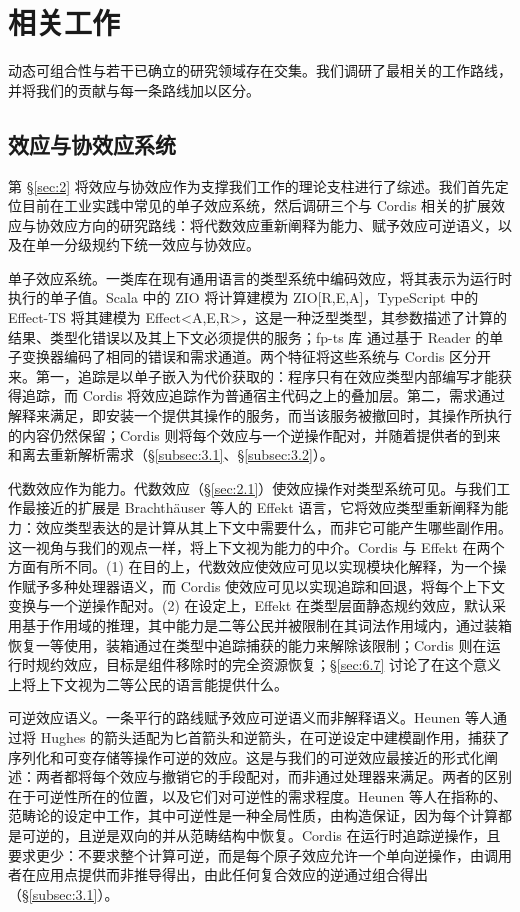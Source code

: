 \section{相关工作}
\label{sec:7}

动态可组合性与若干已确立的研究领域存在交集。我们调研了最相关的工作路线，并将我们的贡献与每一条路线加以区分。

\subsection{效应与协效应系统}
\label{sec:7.1}

第 \S\ref{sec:2} 将效应与协效应作为支撑我们工作的理论支柱进行了综述。我们首先定位目前在工业实践中常见的单子效应系统，然后调研三个与 Cordis 相关的扩展效应与协效应方向的研究路线：将代数效应重新阐释为能力、赋予效应可逆语义，以及在单一分级规约下统一效应与协效应。

单子效应系统。一类库在现有通用语言的类型系统中编码效应，将其表示为运行时执行的单子值。Scala 中的 ZIO\cite{ref82} 将计算建模为 ZIO[R,E,A]，TypeScript 中的 Effect-TS\cite{ref83} 将其建模为 Effect<A,E,R>，这是一种泛型类型，其参数描述了计算的结果、类型化错误以及其上下文必须提供的服务；fp-ts 库\cite{ref84} 通过基于 Reader 的单子变换器编码了相同的错误和需求通道。两个特征将这些系统与 Cordis 区分开来。第一，追踪是以单子嵌入为代价获取的：程序只有在效应类型内部编写才能获得追踪，而 Cordis 将效应追踪作为普通宿主代码之上的叠加层。第二，需求通过解释来满足，即安装一个提供其操作的服务，而当该服务被撤回时，其操作所执行的内容仍然保留；Cordis 则将每个效应与一个逆操作配对，并随着提供者的到来和离去重新解析需求（\S\ref{subsec:3.1}、\S\ref{subsec:3.2}）。

代数效应作为能力。代数效应（\S\ref{sec:2.1}）使效应操作对类型系统可见。与我们工作最接近的扩展是 Brachthäuser 等人的 Effekt 语言，它将效应类型重新阐释为能力\cite{ref85,ref86}：效应类型表达的是计算从其上下文中需要什么，而非它可能产生哪些副作用。这一视角与我们的观点一样，将上下文视为能力的中介。Cordis 与 Effekt 在两个方面有所不同。(1) 在目的上，代数效应使效应可见以实现模块化解释，为一个操作赋予多种处理器语义，而 Cordis 使效应可见以实现追踪和回退，将每个上下文变换与一个逆操作配对。(2) 在设定上，Effekt 在类型层面静态规约效应，默认采用基于作用域的推理，其中能力是二等公民并被限制在其词法作用域内，通过装箱恢复一等使用，装箱通过在类型中追踪捕获的能力来解除该限制；Cordis 则在运行时规约效应，目标是组件移除时的完全资源恢复；\S\ref{sec:6.7} 讨论了在这个意义上将上下文视为二等公民的语言能提供什么。

可逆效应语义。一条平行的路线赋予效应可逆语义而非解释语义。Heunen 等人\cite{ref87}通过将 Hughes 的箭头适配为匕首箭头和逆箭头，在可逆设定中建模副作用，捕获了序列化和可变存储等操作可逆的效应。这是与我们的可逆效应最接近的形式化阐述：两者都将每个效应与撤销它的手段配对，而非通过处理器来满足。两者的区别在于可逆性所在的位置，以及它们对可逆性的需求程度。Heunen 等人在指称的、范畴论的设定中工作，其中可逆性是一种全局性质，由构造保证，因为每个计算都是可逆的，且逆是双向的并从范畴结构中恢复。Cordis 在运行时追踪逆操作，且要求更少：不要求整个计算可逆，而是每个原子效应允许一个单向逆操作，由调用者在应用点提供而非推导得出，由此任何复合效应的逆通过组合得出（\S\ref{subsec:3.1}）。

